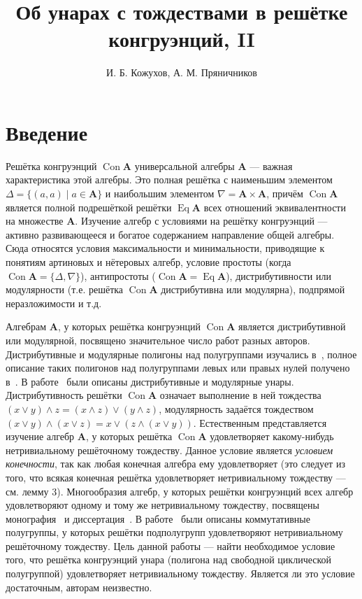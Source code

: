 \documentclass[11pt,twoside,final
]{article}
\title
{%
Об унарах с тождествами в решётке конгруэнций, II}
{%
On unars with identities in congruence lattice, II}
\author
{%
И. Б. Кожухов, А. М. Пряничников}
{%
I. B. Kozhukhov, A. M. Pryanichnikov}
\def\Con{\operatorname{Con}}
\def\Eq{\operatorname{Eq}}
\begin{document}
\maketitle

\enmaketitle

\section{Введение}

Решётка конгруэнций $\Con \mathbf{A}$ универсальной алгебры $\mathbf{A}$ — важная характеристика этой алгебры.
Это полная решётка с наименьшим элементом $\Delta = \{ (a,a) \mid a \in \mathbf{A} \}$ и наибольшим элементом $\nabla = \mathbf{A} \times \mathbf{A}$, причём $\Con \mathbf{A}$ является полной подрешёткой решётки $\Eq \mathbf{A}$ всех отношений эквивалентности на множестве $\mathbf{A}$.
Изучение алгебр с условиями на решётку конгруэнций — активно развивающееся и богатое содержанием направление общей алгебры.
Сюда относятся условия максимальности и минимальности, приводящие к понятиям артиновых и нётеровых алгебр, условие простоты (когда $\Con \mathbf{A} = \{ \Delta, \nabla \}$), антипростоты ($\Con \mathbf{A} = \Eq \mathbf{A}$), дистрибутивности или модулярности (т.е. решётка $\Con \mathbf{A}$ дистрибутивна или модулярна), подпрямой неразложимости и т.д.

Алгебрам $\mathbf{A}$, у которых решётка конгруэнций $\Con \mathbf{A}$ является дистрибутивной или модулярной, посвящено значительное число работ разных авторов. 
Дистрибутивные и модулярные полигоны над полугруппами изучались в~\cite{Ptakhov_2}, полное описание таких полигонов над полугруппами левых или правых нулей получено в~\cite{Khaliullina_3}. 
В работе~\cite{Egorova_4} были описаны дистрибутивные и модулярные унары.
Дистрибутивность решётки $\Con \mathbf{A}$ означает выполнение в ней тождества $ (x \vee y) \wedge z = (x \wedge z) \vee (y \wedge z) $, модулярность задаётся тождеством $ (x \vee y) \wedge (x \vee z) = x \vee (z \wedge (x \vee y)) $.
Естественным представляется изучение алгебр $\mathbf{A}$, у которых решётка $\Con \mathbf{A}$ удовлетворяет какому-нибудь нетривиальному решёточному тождеству.
Данное условие является \textit{условием конечности}, так как любая конечная алгебра ему удовлетворяет (это следует из того, что всякая конечная решётка удовлетворяет нетривиальному тождеству — см. лемму 3).
Многообразия алгебр, у которых решётки конгруэнций всех алгебр удовлетворяют одному и тому же нетривиальному тождеству, посвящены монография~\cite{Kearnes_5} и диссертация~\cite{Nation_6}.
В работе~\cite{Repnitsky_7} были описаны коммутативные полугруппы, у которых решётки подполугрупп удовлетворяют нетривиальному решёточному тождеству.
Цель данной работы — найти необходимое условие того, что решётка конгруэнций унара (полигона над свободной циклической полугруппой) удовлетворяет нетривиальному тождеству.
Является ли это условие достаточным, авторам неизвестно.
\end{document}
